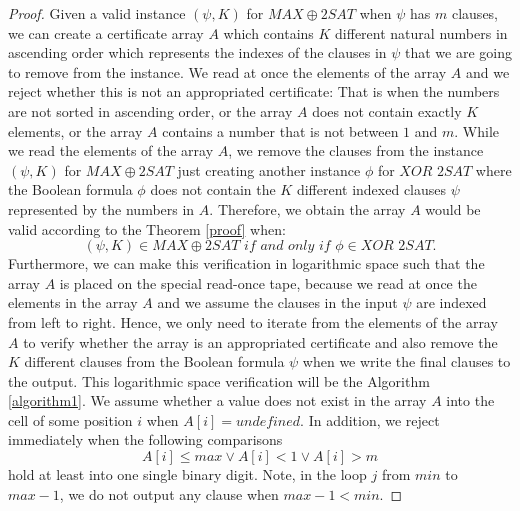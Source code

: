 \documentclass[a4paper,UKenglish,cleveref, autoref]{lipics-v2019}
\begin{document}
\begin{proof}
Given a valid instance $(\psi, K)$ for $MAX\oplus2SAT$ when $\psi$ has $m$ clauses, we can create a certificate array $A$ which contains $K$ different natural numbers in ascending order which represents the indexes of the clauses in $\psi$ that we are going to remove from the instance. We read at once the elements of the array $A$ and we reject whether this is not an appropriated certificate: That is when the numbers are not sorted in ascending order, or the array $A$ does not contain exactly $K$ elements, or the array $A$ contains a number that is not between $1$ and $m$. While we read the elements of the array $A$, we remove the clauses from the instance $(\psi, K)$ for $MAX\oplus2SAT$ just creating another instance $\phi$ for $\textit{XOR 2SAT}$ where the Boolean formula $\phi$ does not contain the $K$ different indexed clauses $\psi$ represented by the numbers in $A$. Therefore, we obtain the array $A$ would be valid according to the Theorem \ref{proof} when:
\[(\psi, K) \in MAX\oplus2SAT \textit{ if and only if } \phi \in \textit{XOR 2SAT}.\]
Furthermore, we can make this verification in logarithmic space such that the array $A$ is placed on the special read-once tape, because we read at once the elements in the array $A$ and we assume the clauses in the input $\psi$ are indexed from left to right. Hence, we only need to iterate from the elements of the array $A$ to verify whether the array is an appropriated certificate and also remove the $K$ different clauses from the Boolean formula $\psi$ when we write the final clauses to the output. This logarithmic space verification will be the Algorithm \ref{algorithm1}. We assume whether a value does not exist in the array $A$ into the cell of some position $i$ when $A[i] = \textit{undefined}$. In addition, we reject immediately when the following comparisons
\[A[i] \leq max \vee A[i] < 1 \vee A[i] > m\]
hold at least into one single binary digit. Note, in the loop $j$ from $min$ to $max - 1$, we do not output any clause when $max - 1 < min$.


\end{proof}
\end{document}

